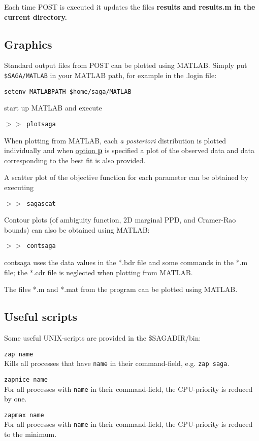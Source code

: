 \documentclass{saclantc}
\begin{document}
Each time {\sf POST} is executed it updates the files \bf results \rm and
\bf results.m \rm in the current directory.

\subsection{Graphics}  
\label{se:graph}

Standard
output files from {\sf POST} can be plotted using MATLAB. Simply put 
{\tt \$SAGA/MATLAB} in your MATLAB path, for example in the .login file:

{\tt setenv MATLABPATH  \$home/saga/MATLAB} 

start up MATLAB and execute

{\tt $> >$ plotsaga}

When plotting from MATLAB, each {\it a posteriori} distribution is
plotted individually and when  
\underline{option {\bf p}} is specified a plot of the observed data and data
corresponding to the best fit is also provided.

A scatter plot of the objective function for each parameter can be
obtained by executing 

{\tt $> >$ sagascat}

Contour plots (of ambiguity function, 2D marginal PPD, and Cramer-Rao
bounds) can also be obtained using MATLAB:

{\tt $> >$ contsaga}

 {\sf contsaga} uses the data values in the
*.bdr file and some commands in the *.m file; the *.cdr file is
neglected when plotting from MATLAB. 


The files *.m and *.mat from the program can be plotted using MATLAB.

\subsection{Useful scripts}
Some useful UNIX-scripts  are provided in the \$SAGADIR/bin:

\noindent
{\tt zap name}\\
Kills all processes that have {\tt name} in their command-field,
e.g. {\tt zap saga}.

\noindent
{\tt zapnice name}\\
For all processes with {\tt name} in their command-field, the
CPU-priority is reduced by one.

\noindent
{\tt zapmax name}\\
For all processes with {\tt name} in their command-field, the
CPU-priority is reduced to the minimum.
\end{document}
